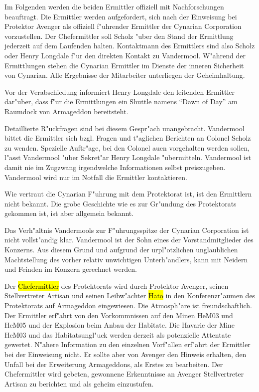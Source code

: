 Im Folgenden werden die beiden Ermittler offiziell mit Nachforschungen beauftragt. Die Ermittler werden aufgefordert, sich nach der Einweisung bei Protektor Avenger als offiziell f"uhrender Ermittler der Cynarian Corporation vorzustellen. Der Chefermittler soll Scholz "uber den Stand der Ermittlung jederzeit auf dem Laufenden halten. Kontaktmann des Ermittlers sind also Scholz oder Henry Longdale f"ur den direkten Kontakt zu Vandermool. W"ahrend der Ermittlungen stehen die Cynarian Ermittler im Dienste der inneren Sicherheit von Cynarian. Alle Ergebnisse der Mitarbeiter unterliegen der Geheimhaltung.

Vor der Verabschiedung informiert Henry Longdale den leitenden Ermittler dar"uber, dass f"ur die Ermittlungen ein Shuttle namens "`Dawn of Day"' am Raumdock von Armageddon bereitsteht.

\begin{remarks}	
	Detaillierte R"uckfragen sind bei diesem Gespr"ach unangebracht. Vandermool bittet die Ermittler sich bzgl. Fragen und t"aglichen Berichten an Colonel Scholz zu wenden. Spezielle Auftr"age, bei den Colonel au\3en vorgehalten werden sollen, l"asst Vandermool "uber Sekret"ar Henry Longdale "ubermitteln. Vandermool ist damit nie im Zugzwang irgendwelche Informationen selbst preiszugeben. Vandermool wird nur im Notfall die Ermittler kontaktieren.

	Wie vertraut die Cynarian F"uhrung mit dem Protektorat ist, ist den Ermittlern nicht bekannt. Die grobe Geschichte wie es zur Gr"undung des Protektorats gekommen ist, ist aber allgemein bekannt.

	Das Verh"altnis Vandermools zur F"uhrungsspitze der Cynarian Corporation ist nicht vollst"andig klar. Vandermool ist der Sohn eines der Vorstandmitglieder des Konzerns. Aus diesem Grund und aufgrund der urpl"otzlichen unglaublichen Machtstellung des vorher relativ unwichtigen Unterh"andlers, kann mit Neidern und Feinden im Konzern gerechnet werden.
\end{remarks}



Der \hl{Chefermittler} des Protektorats wird durch Protektor Avenger, seinen Stellvertreter Artisan und seinen Leibw"achter \hl{Hato} in den Konferenzr"aumen des Protektorats auf Armageddon eingewiesen. Die Atmosph"are ist freundschaftlich. Der Ermittler erf"ahrt von den Vorkommnissen auf den Minen HeM03 und HeM05 und der Explosion beim Anbau der Habitate. Die Havarie der Mine HeM03 und das Habitatsungl"uck werden derzeit als potenzielle Attentate gewertet. N"ahere Information zu den einzelnen Vorf"allen erf"ahrt der Ermittler bei der Einweisung nicht. Er sollte aber von Avenger den Hinweis erhalten, den Unfall bei der Erweiterung Armageddons, als Erstes zu bearbeiten. Der Chefermittler wird gebeten, gewonnene Erkenntnisse an Avenger Stellvertreter Artisan zu berichten und als geheim einzustufen.

